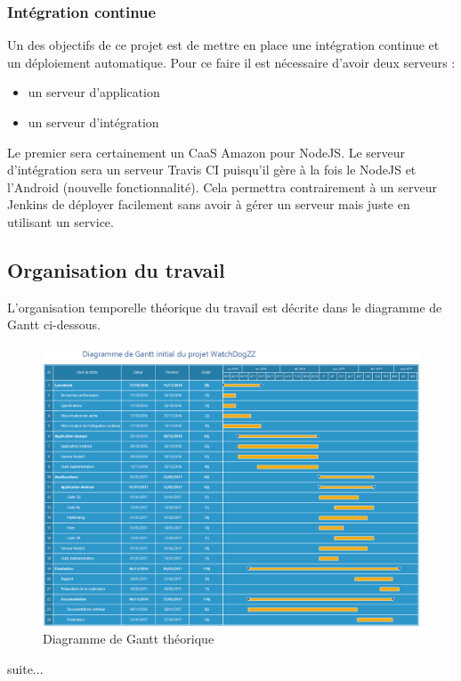 \subsubsection{Intégration continue}
Un des objectifs de ce projet est de mettre en place une intégration continue et un déploiement automatique. Pour ce faire il est nécessaire d'avoir deux serveurs :
\begin{itemize}
    \item un serveur d'application
    \item un serveur d'intégration
\end{itemize}

Le premier sera certainement un CaaS Amazon pour NodeJS. Le serveur d'intégration sera un serveur Travis CI puisqu'il gère à la fois le NodeJS et l'Android (nouvelle fonctionnalité). Cela permettra contrairement à un serveur Jenkins de déployer facilement sans avoir à gérer un serveur mais juste en utilisant un service.

\subsection{Organisation du travail}

L'organisation temporelle théorique du travail est décrite dans le diagramme de Gantt ci-dessous.

\begin{landscape}
    \begin{figure}[h]
        \centering
        \includegraphics[height=\textwidth]{../gantt_initial.png}
        \caption{Diagramme de Gantt théorique}
    \end{figure}
\end{landscape}

suite...